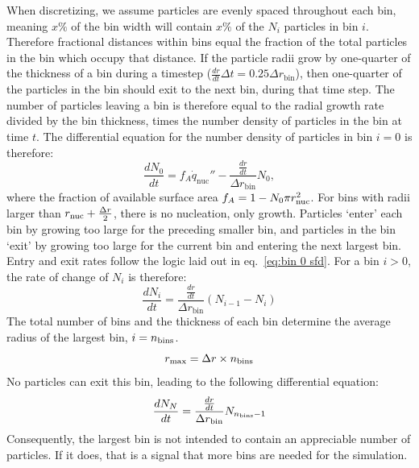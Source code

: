 \documentclass[final,3p,times,twocolumn, 12pt]{elsarticle}    %
\begin{document}
When discretizing, we assume particles are evenly spaced throughout each bin, meaning $x\%$ of the bin width will contain $x\%$ of the $N_i$ particles in bin $i$. Therefore fractional distances within bins equal the fraction of the total particles in the bin which occupy that distance. If the particle radii grow by one-quarter of the thickness of a bin during a timestep ($\frac{dr}{dt}\Delta t=0.25\Delta r_\mathrm{bin}$), then one-quarter of the particles in the bin should exit to the next bin, during that time step. The number of particles leaving a bin is therefore equal to the radial growth rate divided by the bin thickness, times the number density of particles in the bin at time $t$. The differential equation for the number density of particles in bin $i=0$ is therefore:
\begin{equation}
     \frac{dN_0}{dt}=f_A\dot{q}_\mathrm{nuc}'' - \frac{\frac{dr}{dt}}{\Delta r_{\mathrm{bin}}}N_0,
     \label{eq:bin 0 sfd}
\end{equation}
where the fraction of available surface area $f_A = 1 - N_0 \pi r_{\rm nuc}^2$.  For bins with radii larger than $r_{\rm nuc}+\frac{\Delta r}{2}$, there is no nucleation, only growth.  Particles `enter' each bin by growing too large for the preceding smaller bin, and particles in the bin `exit' by growing too large for the current bin and entering the next largest bin. Entry and exit rates follow the logic laid out in eq.~\ref{eq:bin 0 sfd}. For a bin $i>0$, the rate of change of $N_i$ is therefore: %
\begin{equation} 
     \frac{dN_i}{dt}=\frac{\frac{dr}{dt}}{\Delta r_{\mathrm{bin}}}\left(N_{i-1} - N_{i}\right)
     \label{eq:bin i sfd}
\end{equation}
The total number of bins and the thickness of each bin determine the average radius of the largest bin, $i=n_{\rm bins}$. 
\begin{equation}
    r_{\rm max} = \Delta r\times n_{\rm bins}
    \label{eq:r_max}
\end{equation}
No particles can exit this bin, leading to the following differential equation:
\begin{equation}
    \frac{dN_N}{dt}=\frac{\frac{dr}{dt}}{\Delta r_{\mathrm{bin}}}N_{n_{\rm bins}-1}
    \label{eq:bin N sfd}
\end{equation}
Consequently, the largest bin is not intended to contain an appreciable number of particles. If it does, that is a signal that more bins are needed for the simulation.
\end{document}

